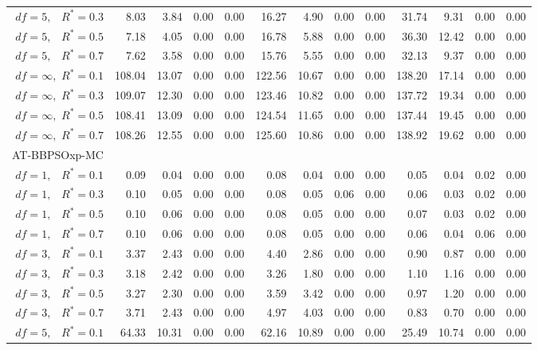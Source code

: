 \documentclass[12pt]{article}
\begin{document}
\begin{appendix}
\begin{table}[ht]
{\begin{tabular}{r|rrrr|rrrr|rrrr}
  $df = 5,\enspace$ $R^* =0.3$ & 8.03 & 3.84 & 0.00 & 0.00 & 16.27 & 4.90 & 0.00 & 0.00 & 31.74 & 9.31 & 0.00 & 0.00 \\ 
  $df = 5,\enspace$ $R^* =0.5$ & 7.18 & 4.05 & 0.00 & 0.00 & 16.78 & 5.88 & 0.00 & 0.00 & 36.30 & 12.42 & 0.00 & 0.00 \\ 
  $df = 5,\enspace$ $R^* =0.7$ & 7.62 & 3.58 & 0.00 & 0.00 & 15.76 & 5.55 & 0.00 & 0.00 & 32.13 & 9.37 & 0.00 & 0.00 \\ 
  $df = \infty,$ $R^* =0.1$ & 108.04 & 13.07 & 0.00 & 0.00 & 122.56 & 10.67 & 0.00 & 0.00 & 138.20 & 17.14 & 0.00 & 0.00 \\ 
  $df = \infty,$ $R^* =0.3$ & 109.07 & 12.30 & 0.00 & 0.00 & 123.46 & 10.82 & 0.00 & 0.00 & 137.72 & 19.34 & 0.00 & 0.00 \\ 
  $df = \infty,$ $R^* =0.5$ & 108.41 & 13.09 & 0.00 & 0.00 & 124.54 & 11.65 & 0.00 & 0.00 & 137.44 & 19.45 & 0.00 & 0.00 \\ 
  $df = \infty,$ $R^* =0.7$ & 108.26 & 12.55 & 0.00 & 0.00 & 125.60 & 10.86 & 0.00 & 0.00 & 138.92 & 19.62 & 0.00 & 0.00 \\ 
\hline
\multicolumn{1}{l|}{AT-BBPSOxp-MC} &&&&&&&&&&&&\\
  $df = 1,\enspace$ $R^* =0.1$ & 0.09 & 0.04 & 0.00 & 0.00 & 0.08 & 0.04 & 0.00 & 0.00 & 0.05 & 0.04 & 0.02 & 0.00 \\ 
  $df = 1,\enspace$ $R^* =0.3$ & 0.10 & 0.05 & 0.00 & 0.00 & 0.08 & 0.05 & 0.06 & 0.00 & 0.06 & 0.03 & 0.02 & 0.00 \\ 
  $df = 1,\enspace$ $R^* =0.5$ & 0.10 & 0.06 & 0.00 & 0.00 & 0.08 & 0.05 & 0.00 & 0.00 & 0.07 & 0.03 & 0.02 & 0.00 \\ 
  $df = 1,\enspace$ $R^* =0.7$ & 0.10 & 0.06 & 0.00 & 0.00 & 0.08 & 0.05 & 0.00 & 0.00 & 0.06 & 0.04 & 0.06 & 0.00 \\ 
  $df = 3,\enspace$ $R^* =0.1$ & 3.37 & 2.43 & 0.00 & 0.00 & 4.40 & 2.86 & 0.00 & 0.00 & 0.90 & 0.87 & 0.00 & 0.00 \\ 
  $df = 3,\enspace$ $R^* =0.3$ & 3.18 & 2.42 & 0.00 & 0.00 & 3.26 & 1.80 & 0.00 & 0.00 & 1.10 & 1.16 & 0.00 & 0.00 \\ 
  $df = 3,\enspace$ $R^* =0.5$ & 3.27 & 2.30 & 0.00 & 0.00 & 3.59 & 3.42 & 0.00 & 0.00 & 0.97 & 1.20 & 0.00 & 0.00 \\ 
  $df = 3,\enspace$ $R^* =0.7$ & 3.71 & 2.43 & 0.00 & 0.00 & 4.97 & 4.03 & 0.00 & 0.00 & 0.83 & 0.70 & 0.00 & 0.00 \\ 
  $df = 5,\enspace$ $R^* =0.1$ & 64.33 & 10.31 & 0.00 & 0.00 & 62.16 & 10.89 & 0.00 & 0.00 & 25.49 & 10.74 & 0.00 & 0.00 \\ 

\end{tabular}}
\end{table}
\end{appendix}
\end{document}
